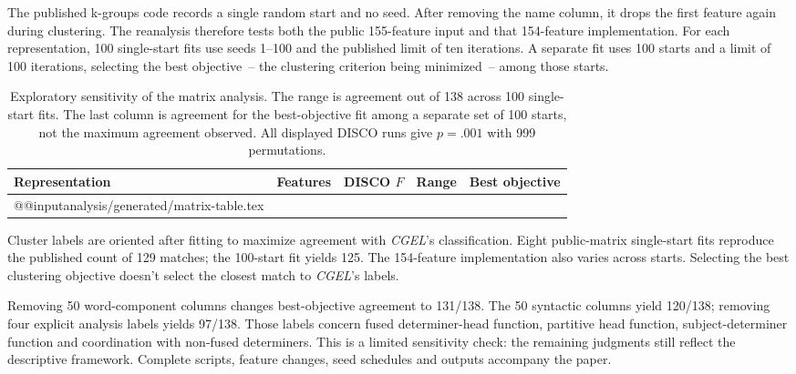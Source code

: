\documentclass[12pt]{article}
\makeatletter
\newcommand{\tablebody}[1]{\csname @@input\endcsname #1 }
\makeatother
\begin{document}
The published k-groups code records a single random start and no seed. After removing the name column, it drops the first feature again during clustering. The reanalysis therefore tests both the public 155-feature input and that 154-feature implementation. For each representation, 100 single-start fits use seeds 1--100 and the published limit of ten iterations. A separate fit uses 100 starts and a limit of 100 iterations, selecting the best objective~-- the clustering criterion being minimized~-- among those starts.

\begin{table}[htbp]
\centering\small
\caption{Exploratory sensitivity of the matrix analysis. The range is agreement out of 138 across 100 single-start fits. The last column is agreement for the best-objective fit among a separate set of 100 starts, not the maximum agreement observed. All displayed DISCO runs give $p=.001$ with 999 permutations.}\label{tab:matrix}
\begin{tabular}{>{\raggedright\arraybackslash}p{5.1cm}rrrr}
\toprule
Representation & Features & DISCO $F$ & Range & Best objective \\
\midrule
\tablebody{analysis/generated/matrix-table.tex}
\bottomrule
\end{tabular}
\end{table}

Cluster labels are oriented after fitting to maximize agreement with \textit{CGEL}'s classification. Eight public-matrix single-start fits reproduce the published count of 129 matches; the 100-start fit yields 125. The 154-feature implementation also varies across starts. Selecting the best clustering objective doesn't select the closest match to \textit{CGEL}'s labels.

Removing 50 word-component columns changes best-objective agreement to 131/138. The 50 syntactic columns yield 120/138; removing four explicit analysis labels yields 97/138. Those labels concern fused determiner-head function, partitive head function, subject-determiner function and coordination with non-fused determiners. This is a limited sensitivity check: the remaining judgments still reflect the descriptive framework. Complete scripts, feature changes, seed schedules and outputs accompany the paper.

\clearpage
\printbibliography
\end{document}
